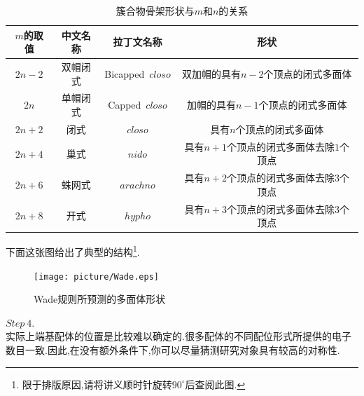 \documentclass{ctexart}
\begin{document}
\begin{table}[H]
    \centering\begin{tabular}{|c|c|c|c|}
        \hline
        $m$的取值   &中文名称   &拉丁文名称 &形状\\\hline
        $2n-2$  &双帽闭式   &Bicapped\ $\mathit{closo}$ & 双加帽的具有$n-2$个顶点的闭式多面体 \\\hline
        $2n$  &单帽闭式   &Capped\ $\mathit{closo}$ & 加帽的具有$n-1$个顶点的闭式多面体 \\\hline
        $2n+2$  &闭式   &$\mathit{closo}$ & 具有$n$个顶点的闭式多面体 \\\hline
        $2n+4$  &巢式   &$\mathit{nido}$ & 具有$n+1$个顶点的闭式多面体去除$1$个顶点 \\\hline
        $2n+6$  &蛛网式   &$\mathit{arachno}$ & 具有$n+2$个顶点的闭式多面体去除$3$个顶点 \\\hline
        $2n+8$  &开式   &$\mathit{hypho}$ & 具有$n+3$个顶点的闭式多面体去除$3$个顶点 \\\hline
    \end{tabular}
    \caption{簇合物骨架形状与$m$和$n$的关系}
\end{table}
下面这张图给出了典型的结构\footnote{限于排版原因,请将讲义顺时针旋转$90^\circ$后查阅此图.}.
\begin{figure}[H]
    \centering\texttt{[image: picture/Wade.eps]}\caption{Wade规则所预测的多面体形状}
\end{figure}
\indent $\mathit{Step\ 4.}$\ \\
\indent 实际上端基配体的位置是比较难以确定的.很多配体的不同配位形式所提供的电子数目一致.因此,在没有额外条件下,你可以尽量猜测研究对象具有较高的对称性.
\end{document}
